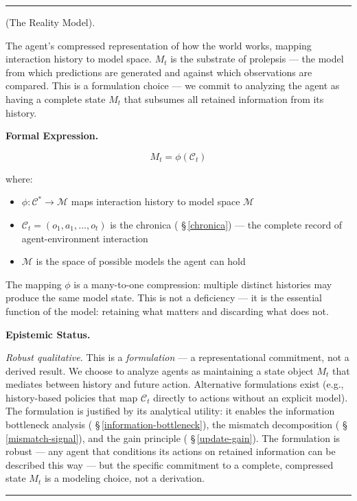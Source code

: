 \documentclass[11pt,oneside]{article}
\newcounter{claim}[section]
\renewcommand{\theclaim}{\thesection.\arabic{claim}}
\newenvironment{segment}[2]{%
  \refstepcounter{claim}%
  \bigskip\noindent\hrule\smallskip
  \noindent{\bfseries #1~\theclaim}\enskip(#2).\par\smallskip
  \noindent\ignorespaces
}{%
  \par\smallskip\noindent\hrule\bigskip
}
\newenvironment{formulation}[1][]{\begin{segment}{Formulation}{#1}}{\end{segment}}
\begin{document}
\begin{formulation}[The Reality Model]
\label{agent-model}
The agent's compressed representation of how the world works, mapping interaction history to model space. $M_t$ is the substrate of prolepsis — the model from which predictions are generated and against which observations are compared. This is a formulation choice — we commit to analyzing the agent as having a complete state $M_t$ that subsumes all retained information from its history.



\medskip\noindent\textbf{Formal Expression.}



$$M_t = \phi(\mathcal{C}_t)$$

where:
\begin{itemize}
  \item $\phi: \mathcal{C}^* \to \mathcal{M}$ maps interaction history to model space $\mathcal{M}$
  \item $\mathcal C_t = (o_1, a_1, \ldots, o_t)$ is the chronica ( \S\,\ref{chronica}) — the complete record of agent-environment interaction
  \item $\mathcal{M}$ is the space of possible models the agent can hold
\end{itemize}


The mapping $\phi$ is a many-to-one compression: multiple distinct histories may produce the same model state. This is not a deficiency — it is the essential function of the model: retaining what matters and discarding what does not.


\medskip\noindent\textbf{Epistemic Status.}


\textit{Robust qualitative.} This is a \textit{formulation} — a representational commitment, not a derived result. We choose to analyze agents as maintaining a state object $M_t$ that mediates between history and future action. Alternative formulations exist (e.g., history-based policies that map $\mathcal C_t$ directly to actions without an explicit model). The formulation is justified by its analytical utility: it enables the information bottleneck analysis ( \S\,\ref{information-bottleneck}), the mismatch decomposition ( \S\,\ref{mismatch-signal}), and the gain principle ( \S\,\ref{update-gain}). The formulation is robust — any agent that conditions its actions on retained information can be described this way — but the specific commitment to a complete, compressed state $M_t$ is a modeling choice, not a derivation.



\end{formulation}
\end{document}
